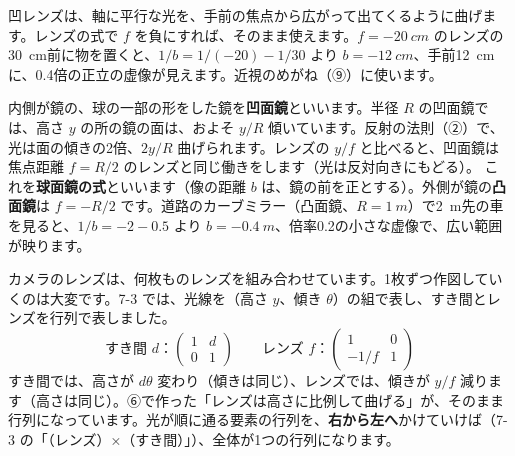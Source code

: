 凹レンズは、軸に平行な光を、手前の焦点から広がって出てくるように曲げます。レンズの式で $f$ を負にすれば、そのまま使えます。$f=\qty{-20}{cm}$ のレンズの\qty{30}{cm}前に物を置くと、$1/b=1/(-20)-1/30$ より $b=\qty{-12}{cm}$、手前\qty{12}{cm}に、0.4倍の正立の虚像が見えます。近視のめがね（⑨）に使います。

\label{ph:波-12:kyumen}内側が鏡の、球の一部の形をした鏡を\textbf{凹面鏡}といいます。半径 $R$ の凹面鏡では、高さ $y$ の所の鏡の面は、およそ $y/R$ 傾いています。反射の法則（②）で、光は面の傾きの2倍、$2y/R$ 曲げられます。レンズの $y/f$ と比べると、凹面鏡は焦点距離 $f=R/2$ のレンズと同じ働きをします（光は反対向きにもどる）。
これを\textbf{球面鏡の式}といいます（像の距離 $b$ は、鏡の前を正とする）。外側が鏡の\textbf{凸面鏡}は $f=-R/2$ です。道路のカーブミラー（凸面鏡、$R=\qty{1}{m}$）で\qty{2}{m}先の車を見ると、$1/b=-2-0.5$ より $b=\qty{-0.4}{m}$、倍率0.2の小さな虚像で、広い範囲が映ります。

\label{ph:波-12:sec7}
カメラのレンズは、何枚ものレンズを組み合わせています。1枚ずつ作図していくのは大変です。7-3 では、光線を（高さ $y$、傾き $\theta$）の組で表し、すき間とレンズを行列で表しました。
\[\text{すき間 }d：\begin{pmatrix}1&d\\0&1\end{pmatrix}\qquad\text{レンズ }f：\begin{pmatrix}1&0\\-1/f&1\end{pmatrix}\]
すき間では、高さが $d\theta$ 変わり（傾きは同じ）、レンズでは、傾きが $y/f$ 減ります（高さは同じ）。⑥で作った「レンズは高さに比例して曲げる」が、そのまま行列になっています。光が順に通る要素の行列を、\textbf{右から左へ}かけていけば（7-3 の「（レンズ）×（すき間）」）、全体が1つの行列になります。

